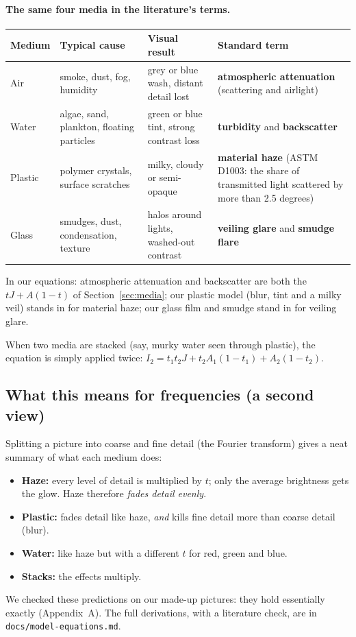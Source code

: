 \documentclass[10pt,a4paper]{article}
\begin{document}
\paragraph{The same four media in the literature's terms.}
\begin{center}\small\begin{tabular}{p{1.4cm}p{4.6cm}p{4.4cm}p{4.8cm}}\toprule
Medium & Typical cause & Visual result & Standard term\\\midrule
Air & smoke, dust, fog, humidity & grey or blue wash, distant detail lost & \textbf{atmospheric attenuation} (scattering and airlight)\\
Water & algae, sand, plankton, floating particles & green or blue tint, strong contrast loss & \textbf{turbidity} and \textbf{backscatter}\\
Plastic & polymer crystals, surface scratches & milky, cloudy or semi-opaque & \textbf{material haze} (ASTM D1003: the share of transmitted light scattered by more than 2.5 degrees)\\
Glass & smudges, dust, condensation, texture & halos around lights, washed-out contrast & \textbf{veiling glare} and \textbf{smudge flare}\\\bottomrule
\end{tabular}\end{center}
In our equations: atmospheric attenuation and backscatter are both the $tJ+A(1-t)$ of Section~\ref{sec:media}; our plastic model (blur, tint and a milky veil) stands in for material haze; our glass film and smudge stand in for veiling glare.

When two media are stacked (say, murky water seen through plastic), the equation is simply applied twice: $I_2 = t_1 t_2 J + t_2 A_1(1-t_1) + A_2(1-t_2)$.

\subsection{What this means for frequencies (a second view)}
Splitting a picture into coarse and fine detail (the Fourier transform) gives a neat summary of what each medium does:
\begin{itemize}
\item \textbf{Haze:} every level of detail is multiplied by $t$; only the average brightness gets the glow. Haze therefore \emph{fades detail evenly}.
\item \textbf{Plastic:} fades detail like haze, \emph{and} kills fine detail more than coarse detail (blur).
\item \textbf{Water:} like haze but with a different $t$ for red, green and blue.
\item \textbf{Stacks:} the effects multiply.
\end{itemize}
We checked these predictions on our made-up pictures: they hold essentially exactly (Appendix~A). The full derivations, with a literature check, are in \texttt{docs/model-equations.md}.
\end{document}
